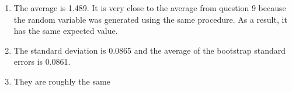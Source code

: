 \documentclass{article}
\begin{document}
\begin{enumerate}[label=(\alph*)]
\item The average is 1.489. It is very close to the average from question 9 because the random variable was generated using the same procedure. As a result, it has the same expected value.
\item The standard deviation is 0.0865 and the average of the bootstrap standard errors is 0.0861.
\item They are roughly the same
\end{enumerate}
\end{document}
